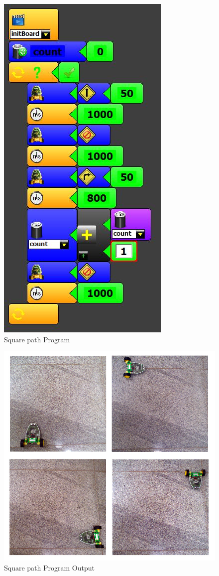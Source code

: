 \documentclass[conference]{IEEEtran}
\begin{document}
\begin{figure}[h]
\centering
\includegraphics[scale=0.5]{Fig_13.png}
\caption{Square path Program}
\end{figure}

\begin{figure}[h]
\centering
\includegraphics[scale=0.3]{Fig_15.png}
\caption{Square path Program Output}
\end{figure}
\end{document}
